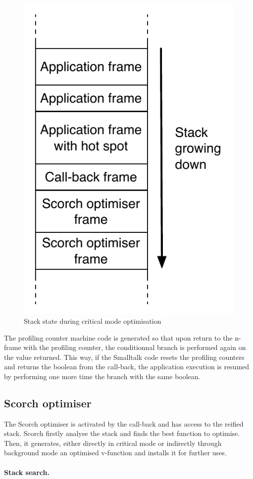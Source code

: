 \documentclass[a4paper,12pt,twoside]{../includes/ThesisStyle}
\begin{document}
\begin{figure}[h!]
    \begin{center}
        \includegraphics[width=0.35\linewidth]{HotSpotCallBackStack}
        \caption{Stack state during critical mode optimisation}
        \label{fig:HotSpotCallBackStack}
    \end{center}
\end{figure}


The profiling counter machine code is generated so that upon return to the n-frame with the profiling counter, the conditionnal branch is performed again on the value returned. This way, if the Smalltalk code resets the profiling counters and returns the boolean from the call-back, the application execution is resumed by performing one more time the branch with the same boolean.


\subsection{Scorch optimiser}

The Scorch optimiser is activated by the call-back and has access to the reified stack. Scorch firstly analyse the stack and finds the best function to optimise. Then, it generates, either directly in critical mode or indirectly through background mode an optimised v-function and installs it for further uses.


\paragraph{Stack search.}
\label{ss:stackSearch}
\end{document}
